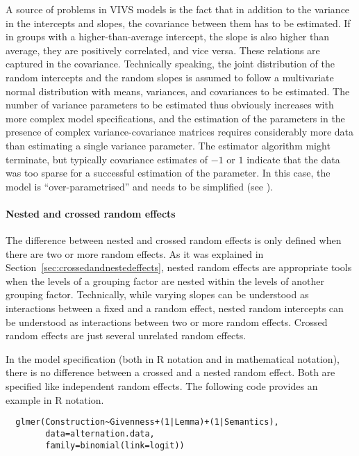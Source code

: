 A source of problems in VIVS models is the fact that in addition to the variance in the intercepts and slopes, the covariance between them has to be estimated.
If in groups with a higher-than-average intercept, the slope is also higher than average, they are positively correlated, and vice versa.
These relations are captured in the covariance.
Technically speaking, the joint distribution of the random intercepts and the random slopes is assumed to follow a multivariate normal distribution with means, variances, and covariances to be estimated.
The number of variance parameters to be estimated thus obviously increases with more complex model specifications, and the estimation of the parameters in the presence of complex variance-covariance matrices requires considerably more data than estimating a single variance parameter.
The estimator algorithm might terminate, but typically covariance estimates of $-1$ or $1$ indicate that the data was too sparse for a successful estimation of the parameter.
In this case, the model is ``over-parametrised'' and needs to be simplified (see \citealt{BatesEa2015a,MatuschekEa2017}).

\paragraph{Nested and crossed random effects}

The difference between nested and crossed random effects is only defined when there are two or more random effects.
As it was explained in Section~\ref{sec:crossedandnestedeffects}, nested random effects are appropriate tools when the levels of a grouping factor are nested within the levels of another grouping factor.
Technically, while varying slopes can be understood as interactions between a fixed and a random effect, nested random intercepts can be understood as interactions between two or more random effects.
Crossed random effects are just several unrelated random effects.

In the model specification (both in R notation and in mathematical notation), there is no difference between a crossed and a nested random effect.
Both are specified like independent random effects.
The following code provides an example in R notation.

\begin{lstlisting}
  glmer(Construction~Givenness+(1|Lemma)+(1|Semantics),
        data=alternation.data,
        family=binomial(link=logit))
\end{lstlisting}

